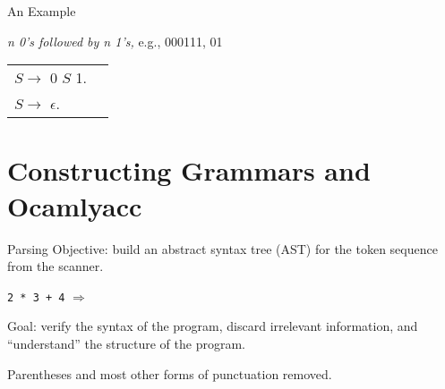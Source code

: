 \documentclass{plt}
\def\plus#1#2{node {\texttt{+}} child {#1} child {#2}}
\def\mult#1#2{node {\texttt{*}} child {#1} child {#2}}
\def\lit#1{node {#1}}
\begin{document}
\begin{frame}{An Example}

\emph{n 0's followed by n 1's,} e.g., 000111, 01
\vspace{40pt}

{\ttfamily
\begin{tabular}{ll}
$S \rightarrow$ 0 $S$ 1. \\ 
$S \rightarrow$ $\epsilon$. 
\end{tabular}
}

\end{frame}

\part{Constructing Grammars and Ocamlyacc}

\begin{frame}{Parsing}
Objective: build an abstract syntax tree (AST) for the token sequence
from the scanner.

\begin{center}
\texttt{2 * 3 + 4} \hspace{3pc} $\Rightarrow$ \hspace{3pc}
\end{center}

\medskip

Goal: verify the syntax of the program, discard irrelevant
information, and ``understand'' the structure of the program.

Parentheses and most other forms of punctuation removed.

\end{frame}
\end{document}
